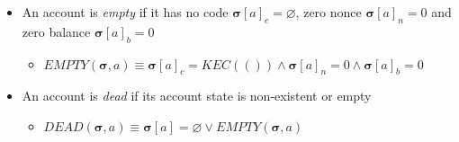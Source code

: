 \documentclass{article}
\begin{document}
\begin{itemize}
\begin{itemize}
\begin{itemize}
\begin{itemize}
            \end{itemize}
        \end{itemize}
        \item An account is \textit{empty} if it has no code $\bm{\sigma}[a]_c = \varnothing$, zero nonce $\bm{\sigma}[a]_n = 0$ and zero balance $\bm{\sigma}[a]_b = 0$
            \begin{itemize}
                \item $EMPTY(\bm{\sigma}, a) \equiv {\bm{\sigma}[a]}_c = {KEC(())} \wedge {\bm{\sigma}[a]}_n = 0 \wedge {\bm{\sigma}[a]}_b = 0$
            \end{itemize}
        \item An account is \textit{dead} if its account state is non-existent or empty 
            \begin{itemize}
                \item $DEAD(\bm{\sigma}, a) \equiv \bm{\sigma}[a] = \varnothing \lor EMPTY(\bm{\sigma}, a)$
            \end{itemize}
    \end{itemize}


\end{itemize}
\end{document}
